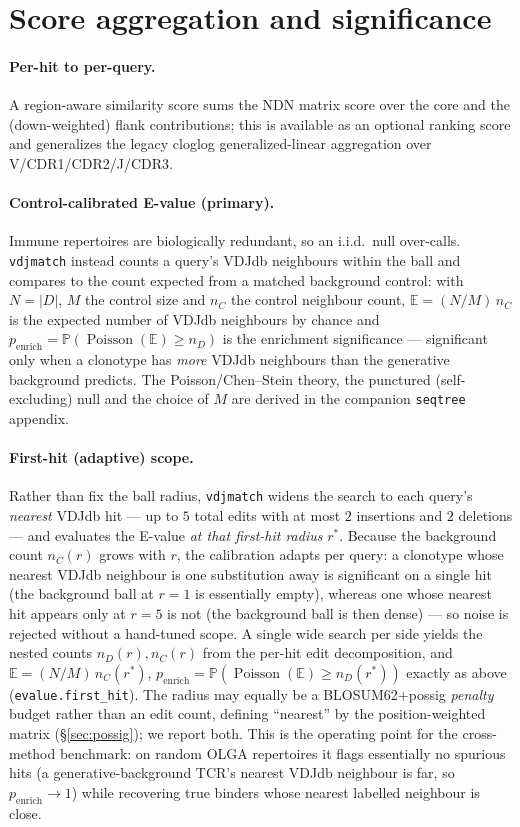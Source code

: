 \documentclass[11pt]{article}
\theoremstyle{oldplain}
\theoremstyle{oldrem}
\DeclareMathOperator{\Poisson}{Poisson}
\newcommand{\E}{\mathbb{E}}
\newcommand{\Prob}{\mathbb{P}}
\begin{document}
\section{Score aggregation and significance}\label{sec:agg}
\paragraph{Per-hit to per-query.} A region-aware similarity score sums the NDN matrix score over the
core and the (down-weighted) flank contributions; this is available as an optional ranking score and
generalizes the legacy cloglog generalized-linear aggregation over V/CDR1/CDR2/J/CDR3.

\paragraph{Control-calibrated E-value (primary).} Immune repertoires are biologically redundant, so an
i.i.d.\ null over-calls. \texttt{vdjmatch} instead counts a query's VDJdb neighbours within the ball
and compares to the count expected from a matched background control: with $N=|D|$, $M$ the control
size and $n_C$ the control neighbour count, $\E=(N/M)\,n_C$ is the expected number of VDJdb neighbours
by chance and $p_{\mathrm{enrich}}=\Prob(\Poisson(\E)\ge n_{D})$ is the enrichment significance ---
significant only when a clonotype has \emph{more} VDJdb neighbours than the generative background
predicts. The Poisson/Chen--Stein theory, the punctured (self-excluding) null and the choice of $M$ are
derived in the companion \texttt{seqtree} appendix.

\paragraph{First-hit (adaptive) scope.} Rather than fix the ball radius, \texttt{vdjmatch} widens the
search to each query's \emph{nearest} VDJdb hit --- up to $5$ total edits with at most $2$ insertions
and $2$ deletions --- and evaluates the E-value \emph{at that first-hit radius} $r^\ast$. Because the
background count $n_C(r)$ grows with $r$, the calibration adapts per query: a clonotype whose nearest
VDJdb neighbour is one substitution away is significant on a single hit (the background ball at $r{=}1$
is essentially empty), whereas one whose nearest hit appears only at $r{=}5$ is not (the background ball
is then dense) --- so noise is rejected without a hand-tuned scope. A single wide search per side yields
the nested counts $n_D(r),n_C(r)$ from the per-hit edit decomposition, and
$\E=(N/M)\,n_C(r^\ast)$, $p_{\mathrm{enrich}}=\Prob(\Poisson(\E)\ge n_D(r^\ast))$ exactly as above
(\texttt{evalue.first\_hit}). The radius may equally be a BLOSUM62$+$possig \emph{penalty} budget rather
than an edit count, defining ``nearest'' by the position-weighted matrix (\S\ref{sec:possig}); we report
both. This is the operating point for the cross-method benchmark: on random OLGA repertoires it flags
essentially no spurious hits (a generative-background TCR's nearest VDJdb neighbour is far, so
$p_{\mathrm{enrich}}\!\to\!1$) while recovering true binders whose nearest labelled neighbour is close.
\end{document}
